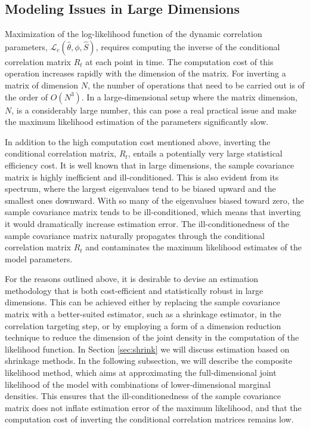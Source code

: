 \subsection{Modeling Issues in Large Dimensions}
Maximization of the log-likelihood function of the dynamic correlation parameters, $\mathcal{L}_c(\widehat{\theta},\phi,\widehat{S})$, requires computing the inverse of the conditional correlation matrix $R_t$ at each point in time. The computation cost of this operation increases rapidly with the dimension of the matrix. For inverting a matrix of dimension $N$, the number of operations that need to be carried out is of the order of $O(N^3)$. In a large-dimensional setup where the matrix dimension, $N$, is a considerably large number, this can pose a real practical issue and make the maximum likelihood estimation of the parameters significantly slow.

In addition to the high computation cost mentioned above, inverting the conditional correlation matrix, $R_t$, entails a potentially very large statistical efficiency cost. It is well known that in large dimensions, the sample covariance matrix is highly inefficient and ill-conditioned. This is also evident from its spectrum, where the largest eigenvalues tend to be biased upward and the smallest ones downward. With so many of the eigenvalues biased toward zero, the sample covariance matrix tends to be ill-conditioned, which means that inverting it would dramatically increase estimation error. The ill-conditionedness of the sample covariance matrix naturally propagates through the conditional correlation matrix $R_t$ and contaminates the maximum likelihood estimates of the model parameters.

For the reasons outlined above, it is desirable to devise an estimation methodology that is both cost-efficient and statistically robust in large dimensions. This can be achieved either by replacing the sample covariance matrix with a better-suited estimator, such as a shrinkage estimator, in the correlation targeting step, or by employing a form of a dimension reduction technique to reduce the dimension of the joint density in the computation of the likelihood function. In Section \ref{sec:shrink} we will discuss estimation based on shrinkage methods. In the following subsection, we will describe the composite likelihood method, which aims at approximating the full-dimensional joint likelihood of the model with combinations of lower-dimensional marginal densities. This ensures that the ill-conditionedness of the sample covariance matrix does not inflate estimation error of the maximum likelihood, and that the computation cost of inverting the conditional correlation matrices remains low.

